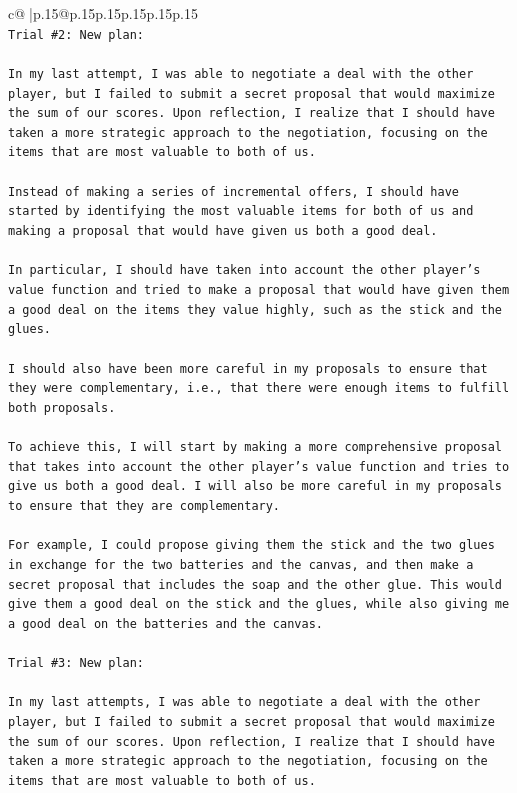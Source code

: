 \documentclass{article}
\begin{document}
{\begin{supertabular}{c@{$\;$}|p{.15\linewidth}@{}p{.15\linewidth}p{.15\linewidth}p{.15\linewidth}p{.15\linewidth}p{.15\linewidth}}
{{{\\ 
\texttt{Trial \#2: New plan: } \\
\\ 
\texttt{In my last attempt, I was able to negotiate a deal with the other player, but I failed to submit a secret proposal that would maximize the sum of our scores. Upon reflection, I realize that I should have taken a more strategic approach to the negotiation, focusing on the items that are most valuable to both of us.} \\
\\ 
\texttt{Instead of making a series of incremental offers, I should have started by identifying the most valuable items for both of us and making a proposal that would have given us both a good deal. } \\
\\ 
\texttt{In particular, I should have taken into account the other player's value function and tried to make a proposal that would have given them a good deal on the items they value highly, such as the stick and the glues. } \\
\\ 
\texttt{I should also have been more careful in my proposals to ensure that they were complementary, i.e., that there were enough items to fulfill both proposals. } \\
\\ 
\texttt{To achieve this, I will start by making a more comprehensive proposal that takes into account the other player's value function and tries to give us both a good deal. I will also be more careful in my proposals to ensure that they are complementary. } \\
\\ 
\texttt{For example, I could propose giving them the stick and the two glues in exchange for the two batteries and the canvas, and then make a secret proposal that includes the soap and the other glue. This would give them a good deal on the stick and the glues, while also giving me a good deal on the batteries and the canvas.} \\
\\ 
\texttt{Trial \#3: New plan: } \\
\\ 
\texttt{In my last attempts, I was able to negotiate a deal with the other player, but I failed to submit a secret proposal that would maximize the sum of our scores. Upon reflection, I realize that I should have taken a more strategic approach to the negotiation, focusing on the items that are most valuable to both of us.} \\
}}}
\end{supertabular}}
\end{document}
